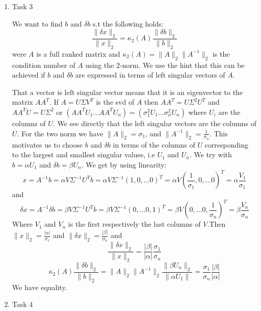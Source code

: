 \message{ !name(assignment4.tex)}\documentclass[a4paper]{article}
\begin{document}
\begin{enumerate}
\item{Task 3}
 
We want to find $b$ and $\delta b$ s.t the following holds:
\begin{equation*}
\frac{\|\delta x\|_2}{\|x\|_2}=\kappa_2(A)\frac{\|\delta b\|_2}{\|b\|_2}
\end{equation*}
were $A$ is a full ranked matrix and $\kappa_2(A)=\|A\|_2\|A^{-1}\|_2$ is the condition number of $A$ using the 2-norm. We use the hint that this can be achieved if $b$ and $\delta b$ are expressed in terms of left singular vectors of $A$.

That a vector is left singular vector means that it is an eigenvector to the matrix $AA^T$. If $A=U\Sigma V^T$ is the svd of $A$ then $AA^T=U\Sigma^2U^T$ and $AA^TU = U\Sigma^2$ or $(AA^TU_1 \ldots AA^TU_n)=(\sigma_1^2U_1 \ldots \sigma_n^2U_n)$ where $U_i$ are the columns of $U$. We see directly that the left singular vectors are the columns of $U$. For the two norm we have $\|A\|_2 = \sigma_1$, and $\|A^{-1}\|_2=\frac{1}{\sigma_n}$. This motivates us to choose $b$ and $\delta b$ in terms of the columns of $U$ corresponding to the largest and smallest singular values, i.e $U_1$ and $U_n$. We try with $b = \alpha U_1$ and $\delta b = \beta U_n$. We get by using linearity:
\begin{equation*}
x = A^{-1}b = \alpha V\Sigma^{-1}U^Tb = \alpha V\Sigma^{-1}(1, 0, \ldots 0)^T = \alpha V(\frac{1}{\sigma_1}, 0, \ldots 0)^T = \alpha \frac{V_1}{\sigma_1}
\end{equation*} 
and 
\begin{equation*}
\delta x = A^{-1}\delta b = \beta V\Sigma^{-1}U^Tb = \beta V\Sigma^{-1}(0, \ldots 0, 1)^T = \beta V(0, \ldots 0, \frac{1}{\sigma_n})^T = \beta \frac{V_n}{\sigma_n}
\end{equation*}
Where $V_1$ and $V_n$ is the first respectively the last columns of $V$.Then $\|x\|_2 = \frac{|\alpha|}{\sigma_1}$ and $\|\delta x\|_2 = \frac{|\beta|}{\sigma_n}$ and  
\begin{equation*}
\frac{\|\delta x\|_2}{\|x\|_2}=\frac{|\beta|}{|\alpha|}\frac{\sigma_1}{\sigma_n}
\end{equation*}
\begin{equation*}
\kappa_2(A)\frac{\|\delta b\|_2}{\|b\|_2}=\|A\|_2\|A^{-1}\|_2\frac{\|\beta U_n\|_2}{\|\alpha U_1\|} =\frac{\sigma_1}{\sigma_n}\frac{|\beta|}{|\alpha|}
\end{equation*}
We have equality.

\item{Task 4}


\end{enumerate}
\end{document}
